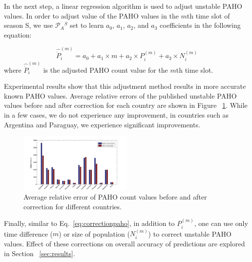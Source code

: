 In the next step, a linear regression algorithm is used to adjust unstable PAHO
values. In order to adjust value of the PAHO values in the $m$th time slot of
season S, we use $\mathcal{P}_A{^S}$ set to learn $a_0$, $a_1$, $a_2$, and
$a_3$ coefficients in the following equation:

\begin{equation}
\hat{\dot{P}}_i^{(m)} = a_0 + a_1 \times m + a_2 \times P_i^{(m)} + a_3 \times N_i^{(m)}
\label{eq:correctionpaho}
\end{equation}
\noindent
where $\hat{\dot{P}}_i^{(m)}$ is the adjusted PAHO count value for the $m$th time slot.

Experimental results show that this adjustment method results in more accurate
known PAHO values. Average relative errors of the published unstable PAHO
values before and after correction for each
country are shown in Figure ~\ref{fig:avgrelerrors}. While in a few cases,
we do not experience any improvement, in countries such as Argentina and Paraguay,
we experience significant improvements.


\begin{figure}[h]
  \centering
    \includegraphics[width=0.5\textwidth]{fig/errs}
  \caption{Average relative error of PAHO count values before and after 
  correction for different countries.}
  \label{fig:avgrelerrors}
\end{figure}

Finally, similar to Eq.~\ref{eq:correctionpaho}, in addition to $P_i^{(m)}$, one can
use only time difference ($m$) or size of population ($N_i^{(m)}$) to correct
unstable PAHO values. Effect of these corrections on overall accuracy of
predictions are explored in Section ~\ref{sec:results}.
